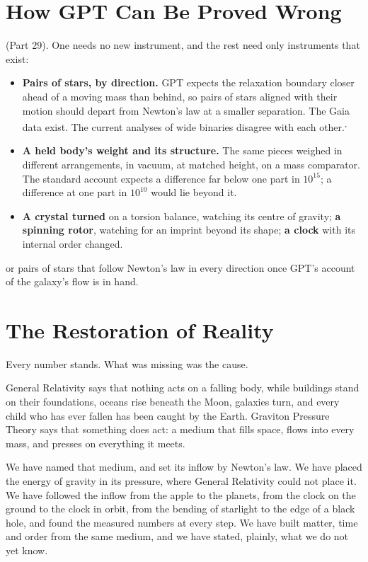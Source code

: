 \documentclass[11pt,a4paper]{article}
\begin{document}
\section{How GPT Can Be Proved Wrong}

 (Part 29). One needs no new instrument, and the rest need only instruments that exist:
\begin{itemize}
\item \textbf{Pairs of stars, by direction.} GPT expects the relaxation boundary closer ahead of a moving mass than behind, so pairs of stars aligned with their motion should depart from Newton's law at a smaller separation. The Gaia data exist. The current analyses of wide binaries disagree with each other.\textsuperscript{,}
\item \textbf{A held body's weight and its structure.} The same pieces weighed in different arrangements, in vacuum, at matched height, on a mass comparator. The standard account expects a difference far below one part in $10^{15}$; a difference at one part in $10^{10}$ would lie beyond it.
\item \textbf{A crystal turned} on a torsion balance, watching its centre of gravity; \textbf{a spinning rotor}, watching for an imprint beyond its shape; \textbf{a clock} with its internal order changed.
\end{itemize}
 or pairs of stars that follow Newton's law in every direction once GPT's account of the galaxy's flow is in hand.

\clearpage
\section*{The Restoration of Reality}

Every number stands. What was missing was the cause.

General Relativity says that nothing acts on a falling body, while buildings stand on their foundations, oceans rise beneath the Moon, galaxies turn, and every child who has ever fallen has been caught by the Earth. Graviton Pressure Theory says that something does act: a medium that fills space, flows into every mass, and presses on everything it meets.

We have named that medium, and set its inflow by Newton's law. We have placed the energy of gravity in its pressure, where General Relativity could not place it. We have followed the inflow from the apple to the planets, from the clock on the ground to the clock in orbit, from the bending of starlight to the edge of a black hole, and found the measured numbers at every step. We have built matter, time and order from the same medium, and we have stated, plainly, what we do not yet know.
\end{document}
